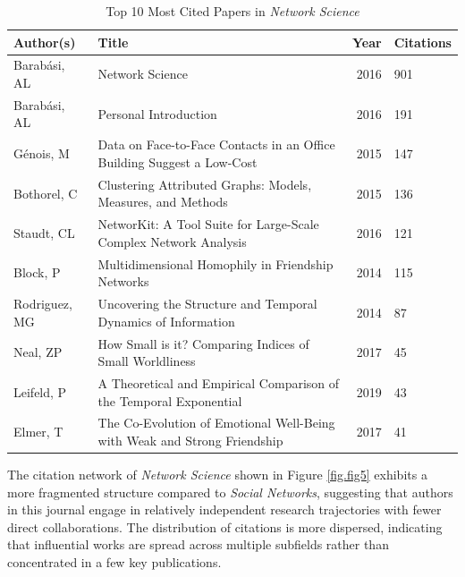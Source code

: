 \documentclass[twocolumn]{article}
\begin{document}
	\begin{table}[htbp]
		\centering
		\scriptsize
		\caption{Top 10 Most Cited Papers in \textit{Network Science}}
		\label{table.tab5}
		\begin{tabularx}{\textwidth}{llrl}
			\toprule
			\textbf{Author(s)} & \textbf{Title} & \textbf{Year} & \textbf{Citations} \\
			\midrule
			Barabási, AL  & Network Science  & 2016  & 901 \\
			 Barabási, AL  & Personal Introduction  & 2016  & 191 \\
			Génois, M  & Data on Face-to-Face Contacts in an Office Building Suggest a Low-Cost  & 2015  & 147 \\
			 Bothorel, C  & Clustering Attributed Graphs: Models, Measures, and Methods  & 2015  & 136 \\
			Staudt, CL  & NetworKit: A Tool Suite for Large-Scale Complex Network Analysis  & 2016  & 121 \\
			Block, P  & Multidimensional Homophily in Friendship Networks  & 2014  & 115 \\
			Rodriguez, MG  & Uncovering the Structure and Temporal Dynamics of Information  & 2014  & 87 \\
			Neal, ZP  & How Small is it? Comparing Indices of Small Worldliness  & 2017  & 45 \\
			 Leifeld, P  & A Theoretical and Empirical Comparison of the Temporal Exponential  & 2019  & 43 \\
			Elmer, T  & The Co-Evolution of Emotional Well-Being with Weak and Strong Friendship  & 2017  & 41 \\
			\bottomrule
		\end{tabularx}
	\end{table}
	
	The citation network of \textit{Network Science} shown in Figure \ref{fig.fig5} exhibits a more fragmented structure compared to \textit{Social Networks}, suggesting that authors in this journal engage in relatively independent research trajectories with fewer direct collaborations. The distribution of citations is more dispersed, indicating that influential works are spread across multiple subfields rather than concentrated in a few key publications.
	
\end{document}
